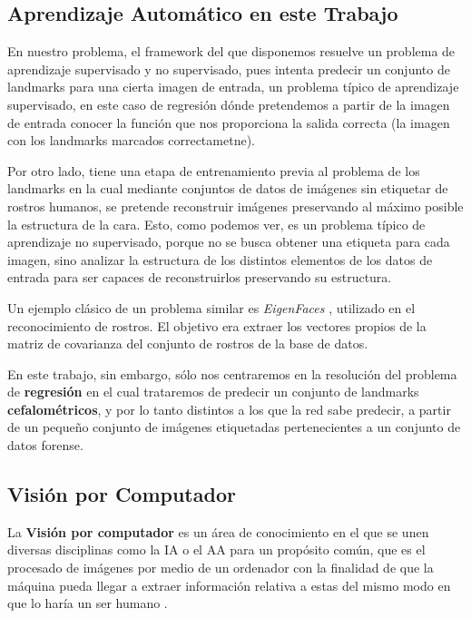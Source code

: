     \subsection{Aprendizaje Automático en este Trabajo}
        \noindent En nuestro problema, el framework del que disponemos resuelve un problema de aprendizaje supervisado y no supervisado, pues intenta predecir un conjunto de landmarks para una cierta imagen de entrada, un problema típico de aprendizaje supervisado, en este caso de regresión dónde pretendemos a partir de la imagen de entrada conocer la función que nos proporciona la salida correcta (la imagen con los landmarks marcados correctametne).

        \medskip

        \noindent Por otro lado, tiene una etapa de entrenamiento previa al problema de los landmarks en la cual mediante conjuntos de datos de imágenes sin etiquetar de rostros humanos, se pretende reconstruir imágenes preservando al máximo posible la estructura de la cara. Esto, como podemos ver, es un problema típico de aprendizaje no supervisado, porque no se busca obtener una etiqueta para cada imagen, sino analizar la estructura de los distintos elementos de los datos de entrada para ser capaces de reconstruirlos preservando su estructura. 
        
        \medskip
        
        \noindent Un ejemplo clásico de un problema similar es \textit{EigenFaces} \cite{savvides2004eigenphases}, utilizado en el reconocimiento de rostros. El objetivo era extraer los vectores propios de la matriz de covarianza del conjunto de rostros de la base de datos.

        \medskip

        \noindent En este trabajo, sin embargo, sólo nos centraremos en la resolución del problema de \textbf{regresión} en el cual trataremos de predecir un conjunto de landmarks \textbf{cefalométricos}, y por lo tanto distintos a los que la red sabe predecir, a partir de un  pequeño conjunto de imágenes etiquetadas pertenecientes a un conjunto de datos forense.

    \subsection{Visión por Computador}
        \noindent La \textbf{Visión por computador} es un área de conocimiento en el que se unen diversas disciplinas como la IA o el AA para un propósito común, que es el procesado de imágenes por medio de un ordenador con la finalidad de que la máquina pueda llegar a extraer información relativa a estas del mismo modo en que lo haría un ser humano \cite{rosenfeld1988computer}. 

